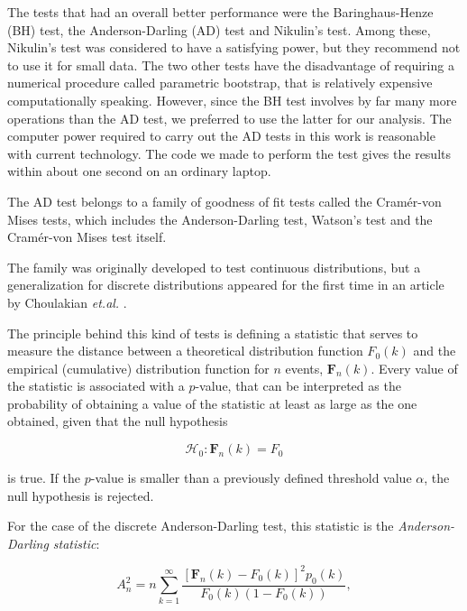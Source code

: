 \documentclass[a4paper]{jpconf}
\begin{document}
\begin{appendices}
The tests that had an overall better performance were the Baringhaus-Henze (BH) test,
 the Anderson-Darling (AD) test and Nikulin's test. Among these, Nikulin's test was considered
 to have a satisfying power, but they recommend not to use it for small data.
 The two other tests have the disadvantage of requiring a numerical procedure called
 parametric bootstrap, that is relatively expensive computationally speaking.
 However, since the BH test involves by far many more operations than the AD test,
 we preferred to use the latter for our analysis.
 The computer power required to carry out the AD tests in this work is reasonable with
 current technology. The code we made to perform the test gives the results within about
 one second on an ordinary laptop.

The AD test belongs to a family of goodness of fit tests called the Cram\'{e}r-von Mises tests,
 which includes the Anderson-Darling test, Watson's test and the Cram\'{e}r-von Mises test
 itself.
 
The family was originally developed to test continuous distributions, but a generalization 
 for discrete distributions appeared for the first time in an article by Choulakian {\it
 et.al.} \cite{Choulakian}. 

 
 The principle behind this kind of tests is defining a statistic that serves to
 measure the distance between a theoretical distribution function $F_0(k)$ and the empirical
 (cumulative) distribution function for $n$ events, $\mathbf{F}_n(k)$.
 Every value of the statistic is associated with a $p$-value, that can be interpreted as the
 probability of obtaining a value of the statistic at least as large as the one obtained, given
 that the null hypothesis
 
 \begin{equation} 
 \label{eq_null_hypothesis}
 \mathcal{H}_0: \mathbf{F}_n(k) = F_0
 \end{equation}
 
 \noindent
 is true. If the $p$-value is smaller than a previously defined threshold value $\alpha$,
 the null hypothesis is rejected.
 
 For the case of the discrete Anderson-Darling test, this statistic is the
 {\it Anderson-Darling statistic}:

 
 \begin{equation}
 \label{eq_statistic}
 A_n^2 = n\sum_{k=1}^{\infty}\frac{[\mathbf{F}_n(k) - F_0(k)]^2p_0(k)}{F_0(k)(1-F_0(k))},
 \end{equation}
 

\end{appendices}
\end{document}
